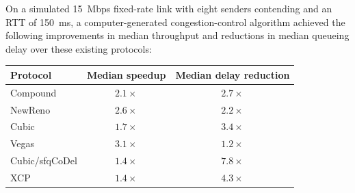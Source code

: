 


On a simulated 15~Mbps fixed-rate link with eight senders contending and
an RTT of 150~ms, a computer-generated congestion-control algorithm
achieved the following improvements in median throughput and
reductions in median queueing delay over these existing protocols:

{\footnotesize
\begin{tabular}{|l|c|c|}
\hline
Protocol & Median speedup & Median delay reduction \\
\hline
\hline
Compound & $2.1\times$ & $2.7\times$ \\
NewReno & $2.6\times$ & $2.2\times$ \\
Cubic & $1.7\times$ & $3.4\times$ \\
Vegas & $3.1\times$ & $1.2\times$ \\
\hline
Cubic/sfqCoDel & $1.4\times$ & $7.8\times$ \\
XCP & $1.4\times$ & $4.3\times$ \\
\hline
\end{tabular}
}


